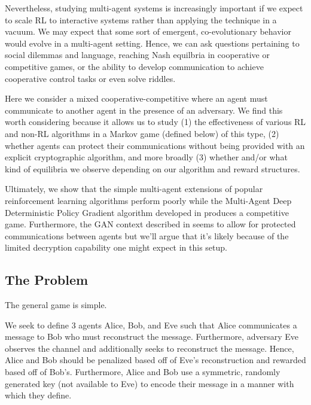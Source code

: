 \documentclass{llncs}
\begin{document}
Nevertheless, studying multi-agent systems is increasingly important if we expect to scale RL to interactive systems rather than applying the technique in a vacuum. We may expect that some sort of emergent, co-evolutionary behavior would evolve in a multi-agent setting. Hence, we can ask questions pertaining to social dilemmas\cite{leibo2017multi} and language\cite{foerster2016learning}, reaching Nash equilbria in cooperative or competitive games\cite{pinto2017robust}, or the ability to develop communication to achieve cooperative control tasks\cite{gupta2017cooperative} or even solve riddles\cite{foerster2016learning}.

Here we consider a mixed cooperative-competitive where an agent must communicate to another agent in the presence of an adversary. We find this worth considering because it allows us to study (1) the effectiveness of various RL and non-RL algorithms in a Markov game (defined below) of this type, (2) whether agents can protect their communications without being provided with an explicit cryptographic algorithm, and more broadly (3) whether and/or what kind of equilibria we observe depending on our algorithm and reward structures. 

Ultimately, we show that the simple multi-agent extensions of popular reinforcement learning algorithms perform poorly while the Multi-Agent Deep Deterministic Policy Gradient algorithm developed in \cite{lowe2017multi} produces a competitive game. Furthermore, the GAN context described in \cite{abadi2016learning} seems to allow for protected communications between agents but we'll argue that it's likely because of the limited decryption capability one might expect in this setup. 
\subsection{The Problem}
%
The general game is simple.

We seek to define 3 agents Alice, Bob, and Eve such that Alice communicates a message to Bob who must reconstruct the message. Furthermore, adversary Eve observes the channel and additionally seeks to reconstruct the message. Hence, Alice and Bob should be penalized based off of Eve's reconstruction and rewarded based off of Bob's. Furthermore, Alice and Bob use a symmetric, randomly generated key (not available to Eve) to encode their message in a manner with which they define. 
\end{document}
